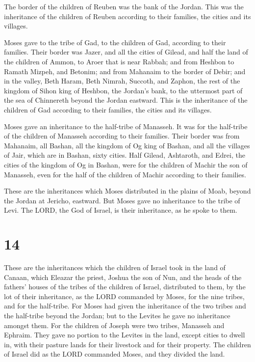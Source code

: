  The border of the children of Reuben was the bank of the
Jordan. This was the inheritance of the children of Reuben according to
their families, the cities and its villages.

 Moses gave to the tribe of Gad, to the children of Gad,
according to their families.  Their border was Jazer, and
all the cities of Gilead, and half the land of the children of Ammon, to
Aroer that is near Rabbah;  and from Heshbon to Ramath
Mizpeh, and Betonim; and from Mahanaim to the border of Debir;
 and in the valley, Beth Haram, Beth Nimrah, Succoth, and
Zaphon, the rest of the kingdom of Sihon king of Heshbon, the Jordan's
bank, to the uttermost part of the sea of Chinnereth beyond the Jordan
eastward.  This is the inheritance of the children of Gad
according to their families, the cities and its villages.

 Moses gave an inheritance to the half-tribe of Manasseh.
It was for the half-tribe of the children of Manasseh according to their
families.  Their border was from Mahanaim, all Bashan, all
the kingdom of Og king of Bashan, and all the villages of Jair, which
are in Bashan, sixty cities.  Half Gilead, Ashtaroth, and
Edrei, the cities of the kingdom of Og in Bashan, were for the children
of Machir the son of Manasseh, even for the half of the children of
Machir according to their families.

 These are the inheritances which Moses distributed in the
plains of Moab, beyond the Jordan at Jericho, eastward. 
But Moses gave no inheritance to the tribe of Levi. The LORD, the God of
Israel, is their inheritance, as he spoke to them.

\hypertarget{section-13}{%
\section{14}\label{section-13}}

 These are the inheritances which the children of Israel
took in the land of Canaan, which Eleazar the priest, Joshua the son of
Nun, and the heads of the fathers' houses of the tribes of the children
of Israel, distributed to them,  by the lot of their
inheritance, as the LORD commanded by Moses, for the nine tribes, and
for the half-tribe.  For Moses had given the inheritance of
the two tribes and the half-tribe beyond the Jordan; but to the Levites
he gave no inheritance amongst them.  For the children of
Joseph were two tribes, Manasseh and Ephraim. They gave no portion to
the Levites in the land, except cities to dwell in, with their pasture
lands for their livestock and for their property.  The
children of Israel did as the LORD commanded Moses, and they divided the
land.

